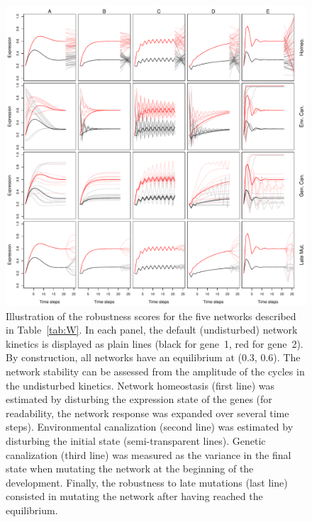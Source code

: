 \documentclass{article}
\begin{document}
\clearpage
\begin{figure}[h!]
\includegraphics[width=15cm]{figures/T2-2-2}
\caption{\label{fig:simpanels} Illustration of the robustness scores for the five networks described in Table~\ref{tab:W}. In each panel, the default (undisturbed) network kinetics is displayed as plain lines (black for gene~1, red for gene~2). By construction, all networks have an equilibrium at (0.3, 0.6). The network stability can be assessed from the amplitude of the cycles in the undisturbed kinetics. Network homeostasis (first line) was estimated by disturbing the expression state of the genes (for readability, the network response was expanded over several time steps). Environmental canalization (second line) was estimated by disturbing the initial state (semi-transparent lines). Genetic canalization (third line) was measured as the variance in the final state when mutating the network at the beginning of the development. Finally, the robustness to late mutations (last line) consisted in mutating the network after having reached the equilibrium.  }
\end{figure}
\end{document}
